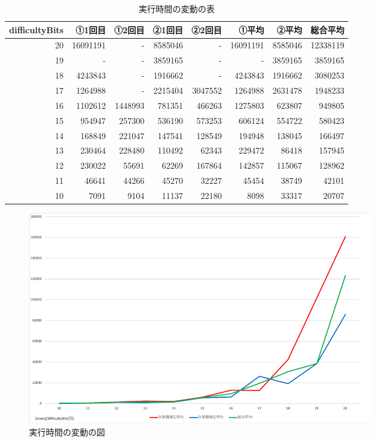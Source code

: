 \documentclass[uplatex, twocolumn, dvipdfmx, 10pt]{jsarticle}
\begin{document}
\begin{table}[htb]
  \begin{center}
    \caption{実行時間の変動の表}
    \begin{tabular}{|r|r|r|r|r||r|r|r|} \hline
      difficultyBits & ①1回目 & ①2回目 & ②1回目 & ②2回目 & ①平均 & ②平均 & 総合平均\\ \hline \hline
      20 & 16091191 & - & 8585046 & - & 16091191 & 8585046 & 12338119\\
      19 & - & - & 3859165 & - & - & 3859165 & 3859165\\
      18 & 4243843 & - & 1916662 & - & 4243843 & 1916662 & 3080253 \\
      17 & 1264988 & - & 2215404 & 3047552 & 1264988 & 2631478 & 1948233\\
      16 & 1102612 & 1448993 & 781351 & 466263 & 1275803 & 623807 & 949805\\
      15 & 954947 & 257300 & 536190 & 573253 & 606124 & 554722 & 580423\\
      14 & 168849 & 221047 & 147541 & 128549 & 194948 & 138045 & 166497\\
      13 & 230464 & 228480 & 110492 & 62343 & 229472 & 86418 & 157945\\
      12 & 230022 & 55691 & 62269 & 167864 & 142857 & 115067 & 128962\\
      11 & 46641 & 44266 & 45270 & 32227 & 45454 & 38749 & 42101\\
      10 & 7091 & 9104 & 11137 & 22180 & 8098 & 33317 & 20707\\ \hline
    \end{tabular}
  \end{center}
\end{table}

\begin{figure}
  \begin{center}
    \includegraphics[width=15cm]{glaph.png}
    \caption{実行時間の変動の図}
  \end{center}
\end{figure}
\end{document}

